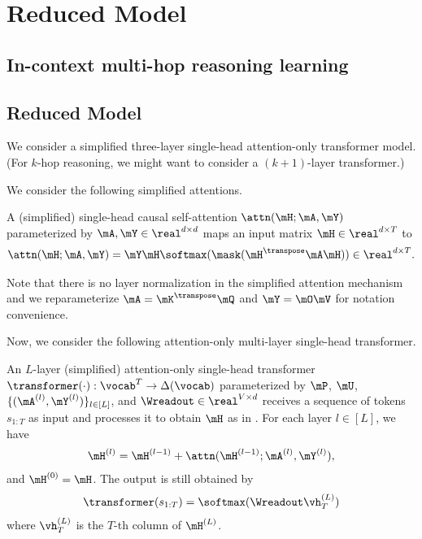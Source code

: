 \section{Reduced Model}
\label{sec:reduced_model}

\subsection{In-context multi-hop reasoning learning}

\subsection{Reduced Model}

We consider a simplified three-layer single-head attention-only transformer model. (For $k$-hop reasoning, we might want to consider a $(k+1)$-layer transformer.)

We consider the following simplified attentions. 

\begin{definition}
\label{defn:simplified_attn} 
A (simplified) single-head causal self-attention $\attn(\mH;\mA,\mY)$ parameterized by $\mA, \mY \in \real^{d \times d}$ maps an input matrix $\mH \in \real^{d \times T}$ to
\begin{align*}
\attn(\mH;\mA, \mY) = \mY\mH\softmax(\mask(\mH^\transpose\mA\mH)) \in \real^{d\times T}.
\end{align*}
\end{definition}

Note that there is no layer normalization in the simplified attention mechanism and we reparameterize $\mA = \mK^\transpose\mQ$ and $\mY = \mO\mV$ for notation convenience.

Now, we consider the following attention-only multi-layer single-head transformer.

\begin{definition}
\label{defn:simplified_transformer} 
    An $L$-layer (simplified) attention-only single-head transformer $\transformer(\cdot): \vocab^T \to \Delta(\vocab)$ parameterized by $\mP$, $\mU$, $\{(\mA^{(l)}, \mY^{(l)})\}_{l\in[L]}$, and $\Wreadout \in \real^{V \times d}$ receives a sequence of tokens $s_{1:T}$ as input and processes it to obtain $\mH$ as in .
    For each layer $l \in [L]$, we have
    \begin{align*}
        \mH^{(l)} =  \mH^{(l-1)} + \attn(\mH^{(l-1)}; \mA^{(l)},\mY^{(l)}), 
    \end{align*}
    and $\mH^{(0)} = \mH$. The output is still obtained by 
    \begin{align*}
        \transformer(s_{1:T}) = \softmax(\Wreadout\vh_T^{(L)})
    \end{align*}
    where $\vh_T^{(L)}$ is the $T$-th column of $\mH^{(L)}$.
\end{definition}


